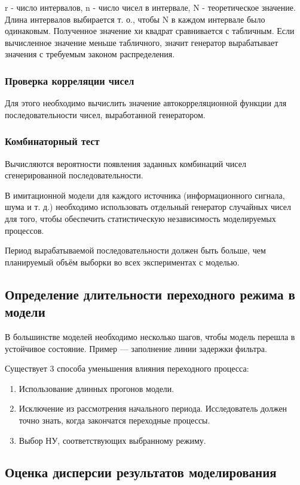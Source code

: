 \documentclass[12pt, russian, oneside, article]{ncc}
\begin{document}
r - число интервалов, n - число чисел в интервале, N - теоретическое значение. Длина интервалов выбирается т. о., чтобы N в каждом интервале было одинаковым. Полученное значение хи квадрат сравнивается с табличным. Если вычисленное значение меньше табличного, значит генератор вырабатывает значения с требуемым законом распределения.
\subsubsection{Проверка корреляции чисел}
\label{sec-7_1_2}


Для этого необходимо вычислить значение автокорреляционной функции для последовательности чисел, выработанной генератором.
\subsubsection{Комбинаторный тест}
\label{sec-7_1_3}


Вычисляются вероятности появления заданных комбинаций чисел сгенерированной последовательности.

В имитационной модели для каждого источника (информационного сигнала, шума и т. д.) необходимо использовать отдельный генератор случайных чисел для того, чтобы обеспечить статистическую независимость моделируемых процессов.

Период вырабатываемой последовательности должен быть больше, чем планируемый объём выборки во всех экспериментах с моделью.
\subsection{Определение длительности переходного режима в модели}
\label{sec-7_2}


В большинстве моделей необходимо несколько шагов, чтобы модель перешла в устойчивое состояние. Пример --- заполнение линии задержки фильтра.

Существует 3 способа уменьшения влияния переходного процесса:

\begin{enumerate}
\item Использование длинных прогонов модели.
\item Исключение из рассмотрения начального периода. Исследователь должен точно знать, когда закончатся переходные процессы.
\item Выбор НУ, соответствующих выбранному режиму.
\end{enumerate}
\subsection{Оценка дисперсии результатов моделирования}
\label{sec-7_3}
\end{document}
